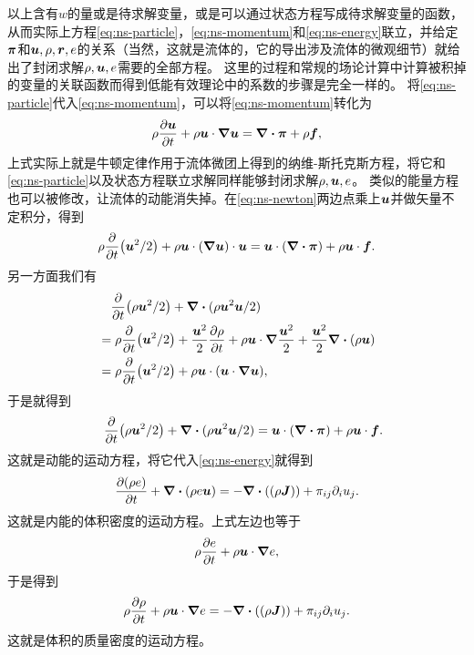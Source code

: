 以上含有$w$的量或是待求解变量，或是可以通过状态方程写成待求解变量的函数，从而实际上方程\eqref{eq:ns-particle}，\eqref{eq:ns-momentum}和\eqref{eq:ns-energy}联立，并给定$\vb*{\pi}$和$\vb*{u}, \rho, \vb*{r}, e$的关系（当然，这就是流体的，它的导出涉及流体的微观细节）就给出了封闭求解$\rho, \vb*{u}, e$需要的全部方程。
这里的过程和常规的场论计算中计算被积掉的变量的关联函数而得到低能有效理论中的系数的步骤是完全一样的。
将\eqref{eq:ns-particle}代入\eqref{eq:ns-momentum}，可以将\eqref{eq:ns-momentum}转化为
\begin{equation}
    \rho \pdv{\vb*{u}}{t} + \rho \vb*{u} \cdot \grad{\vb*{u}} = \div{\vb*{\pi}} + \rho \vb*{f},
    \label{eq:ns-newton}
\end{equation}
上式实际上就是牛顿定律作用于流体微团上得到的纳维-斯托克斯方程，将它和\eqref{eq:ns-particle}以及状态方程联立求解同样能够封闭求解$\rho, \vb*{u}, e$。
类似的能量方程也可以被修改，让流体的动能消失掉。在\eqref{eq:ns-newton}两边点乘上$\vb*{u}$并做矢量不定积分，得到
\[
    \rho \pdv{t}(\vb*{u}^2 / 2) + \rho \vb*{u} \cdot (\grad{\vb*{u}}) \cdot \vb*{u} = \vb*{u} \cdot (\div{\vb*{\pi}}) + \rho \vb*{u} \cdot \vb*{f}.
\]
另一方面我们有
\[
    \begin{aligned}
        &\quad \pdv{t} (\rho \vb*{u}^2 / 2) + \div{(\rho \vb*{u}^2 \vb*{u} / 2)} \\
        &= \rho \pdv{t}(\vb*{u}^2 / 2) + \frac{\vb*{u}^2}{2} \pdv{\rho}{t} + \rho \vb*{u} \cdot \grad \frac{\vb*{u}^2}{2} + \frac{\vb*{u}^2}{2} \div{(\rho \vb*{u})} \\
        &= \rho \pdv{t}(\vb*{u}^2 / 2) + \rho \vb*{u} \cdot (\vb*{u} \cdot \grad \vb*{u}),
    \end{aligned}
\]
于是就得到
\begin{equation}
    \quad \pdv{t} (\rho \vb*{u}^2 / 2) + \div{(\rho \vb*{u}^2 \vb*{u} / 2)} = \vb*{u} \cdot (\div{\vb*{\pi}}) + \rho \vb*{u} \cdot \vb*{f}.
\end{equation}
这就是动能的运动方程，将它代入\eqref{eq:ns-energy}就得到
\begin{equation}
    \pdv{(\rho e)}{t} + \div{(\rho e \vb*{u})} = - \div((\rho \vb*{J})) + \pi_{ij} \partial_i u_j.
\end{equation}
这就是内能的体积密度的运动方程。上式左边也等于
\[
    \rho \pdv{e}{t} + \rho \vb*{u} \cdot \grad e,
\]
于是得到
\begin{equation}
    \rho \pdv{\rho}{t} + \rho \vb*{u} \cdot \grad e = - \div((\rho \vb*{J})) + \pi_{ij} \partial_i u_j.
\end{equation}
这就是体积的质量密度的运动方程。

